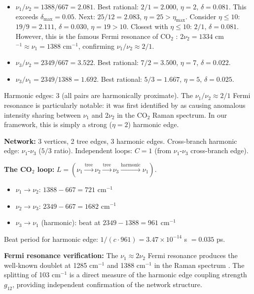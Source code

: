 \documentclass[11pt,a4paper]{article}
\theoremstyle{definition}
\theoremstyle{remark}
\newcommand{\etamax}{\eta_{\mathrm{max}}}
\begin{document}
\begin{itemize}[nosep]
\item $\nu_1/\nu_2 = 1388/667 = 2.081$. Best rational: $2/1 = 2.000$, $\eta = 2$, $\delta = 0.081$. This exceeds $\delta_{\max} = 0.05$. Next: $25/12 = 2.083$, $\eta = 25 > \etamax$. Consider $\eta \leq 10$: $19/9 = 2.111$, $\delta = 0.030$, $\eta = 19 > 10$. Closest with $\eta \leq 10$: $2/1$, $\delta = 0.081$. However, this is the famous Fermi resonance of CO$_2$ \citep{fermi1931}: $2\nu_2 = 1334$ cm$^{-1} \approx \nu_1 = 1388$ cm$^{-1}$, confirming $\nu_1/\nu_2 \approx 2/1$.
\item $\nu_3/\nu_2 = 2349/667 = 3.522$. Best rational: $7/2 = 3.500$, $\eta = 7$, $\delta = 0.022$.
\item $\nu_3/\nu_1 = 2349/1388 = 1.692$. Best rational: $5/3 = 1.667$, $\eta = 5$, $\delta = 0.025$.
\end{itemize}

Harmonic edges: 3 (all pairs are harmonically proximate). The $\nu_1/\nu_2 \approx 2/1$ Fermi resonance is particularly notable: it was first identified by \citet{fermi1931} as causing anomalous intensity sharing between $\nu_1$ and $2\nu_2$ in the CO$_2$ Raman spectrum. In our framework, this is simply a strong ($\eta = 2$) harmonic edge.

\textbf{Network:} 3 vertices, 2 tree edges, 3 harmonic edges. Cross-branch harmonic edge: $\nu_1$-$\nu_3$ ($5/3$ ratio). Independent loops: $C = 1$ (from $\nu_1$-$\nu_3$ cross-branch edge).

\textbf{The CO$_2$ loop:} $L = (\nu_1 \xrightarrow{\text{tree}} \nu_2 \xrightarrow{\text{tree}} \nu_3 \xrightarrow{\text{harmonic}} \nu_1)$.
\begin{itemize}[nosep]
\item $\nu_1 \to \nu_2$: $1388 - 667 = 721$ cm$^{-1}$
\item $\nu_2 \to \nu_3$: $2349 - 667 = 1682$ cm$^{-1}$
\item $\nu_3 \to \nu_1$ (harmonic): beat at $2349 - 1388 = 961$ cm$^{-1}$
\end{itemize}

Beat period for harmonic edge: $1/(c \cdot 961) = 3.47 \times 10^{-14}$ s $= 0.035$ ps.

\textbf{Fermi resonance verification:} The $\nu_1 \approx 2\nu_2$ Fermi resonance produces the well-known doublet at 1285 cm$^{-1}$ and 1388 cm$^{-1}$ in the Raman spectrum \citep{fermi1931, herzberg1945}. The splitting of 103 cm$^{-1}$ is a direct measure of the harmonic edge coupling strength $g_{12}$, providing independent confirmation of the network structure.
\end{document}
